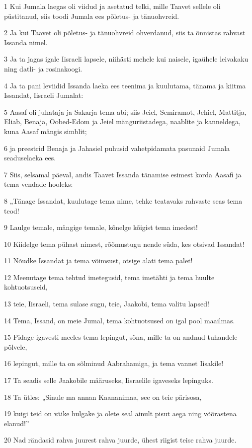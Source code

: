 \par 1 Kui Jumala laegas oli viidud ja asetatud telki, mille Taavet sellele oli püstitanud, siis toodi Jumala ees põletus- ja tänuohvreid.
\par 2 Ja kui Taavet oli põletus- ja tänuohvreid ohverdanud, siis ta õnnistas rahvast Issanda nimel.
\par 3 Ja ta jagas igale Iisraeli lapsele, niihästi mehele kui naisele, igaühele leivakaku ning datli- ja rosinakoogi.
\par 4 Ja ta pani leviidid Issanda laeka ees teenima ja kuulutama, tänama ja kiitma Issandat, Iisraeli Jumalat:
\par 5 Aasaf oli juhataja ja Sakarja tema abi; siis Jeiel, Semiramot, Jehiel, Mattitja, Eliab, Benaja, Oobed-Edom ja Jeiel mänguriistadega, naablite ja kanneldega, kuna Aasaf mängis simblit;
\par 6 ja preestrid Benaja ja Jahasiel puhusid vahetpidamata pasunaid Jumala seaduselaeka ees.
\par 7 Siis, selsamal päeval, andis Taavet Issanda tänamise esimest korda Aasafi ja tema vendade hooleks:
\par 8 „Tänage Issandat, kuulutage tema nime, tehke teatavaks rahvaste seas tema teod!
\par 9 Laulge temale, mängige temale, kõnelge kõigist tema imedest!
\par 10 Kiidelge tema pühast nimest, rõõmustugu nende süda, kes otsivad Issandat!
\par 11 Nõudke Issandat ja tema võimsust, otsige alati tema palet!
\par 12 Meenutage tema tehtud imetegusid, tema imetähti ja tema huulte kohtuotsuseid,
\par 13 teie, Iisraeli, tema sulase sugu, teie, Jaakobi, tema valitu lapsed!
\par 14 Tema, Issand, on meie Jumal, tema kohtuotsused on igal pool maailmas.
\par 15 Pidage igavesti meeles tema lepingut, sõna, mille ta on andnud tuhandele põlvele,
\par 16 lepingut, mille ta on sõlminud Aabrahamiga, ja tema vannet Iisakile!
\par 17 Ta seadis selle Jaakobile määruseks, Iisraelile igaveseks lepinguks.
\par 18 Ta ütles: „Sinule ma annan Kaananimaa, see on teie pärisosa,
\par 19 kuigi teid on väike hulgake ja olete seal ainult pisut aega ning võõrastena elanud!”
\par 20 Nad rändasid rahva juurest rahva juurde, ühest riigist teise rahva juurde.
